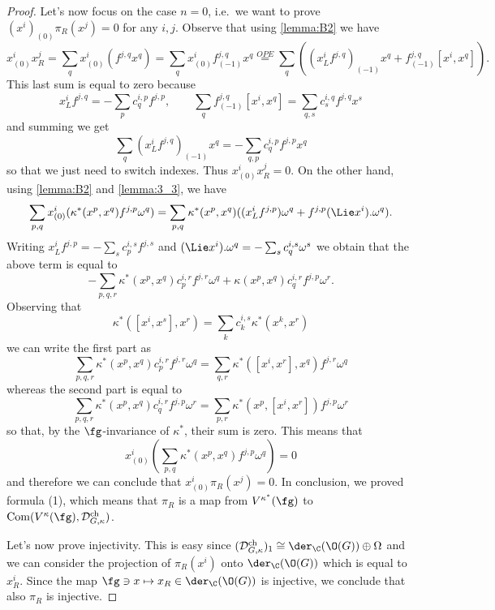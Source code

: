 \documentclass[a4paper, 10pt]{article}
\newcommand{\Dc}{ \mathcal{D}^{\mathrm{ch}}_{G, \kappa} }         %
\begin{document}
\begin{proof}
                Let's now focus on the case $n = 0$, i.e.\ we want to prove $(x^i)_{(0)}\pi_R(x^j) = 0$ for any $i, j$. Observe that using \cref{lemma:B2} we have \[x^i_{(0)}x^j_R = \sum_q x^i_{(0)}(f^{j,q}x^q) = \sum_q x^i_{(0)}f^{j,q}_{(-1)}x^q \stackrel{OPE}{=} \sum_q ((x^i_Lf^{j,q})_{(-1)}x^q + f^{j,q}_{(-1)}[x^i, x^q]).  \] This last sum is equal to zero because \[x^i_Lf^{j,q} = -\sum_p c^{i,p}_qf^{j,p},\qquad \sum_q f^{j,q}_{(-1)}[x^i,x^q] = \sum_{q,s} c_s^{i,q}f^{j,q}x^s \] and summing we get \[\sum_q (x^i_Lf^{j,q})_{(-1)}x^q = - \sum_{q,p} c^{i,p}_qf^ {j,p}x^q \] so that we just need to switch indexes. Thus $x^i_{(0)}x^j_R = 0$.
                On the other hand, using \cref{lemma:B2} and \cref{lemma:3_3}, we have 
                \begin{gather*}
                    \sum_{p,q} x^i_{(0)}(\kappa^*(x^p, x^q)f^{j,p}\omega^q) = \sum_{p,q} \kappa^*(x^p, x^q)((x^i_Lf^{j, p})\omega^q + f^{j,p}(\Lie x^i).\omega^q).
                \end{gather*}
                Writing $x^i_Lf^{j,p} = -\sum_s c^{i,s}_pf^{j,s}$ and $(\Lie x^i).\omega^q= -\sum_s c^{i,s}_q\omega^s$ we obtain that the above term is equal to \[-\sum_{p,q,r} \kappa^*(x^p, x^q)c^{i,r}_pf^{j,r}\omega^q + \kappa(x^p, x^q)c^{i,r}_qf^{j,p}\omega^r. \] Observing that \[\kappa^*([x^i, x^s], x^r) = \sum_k c^{i,s}_k \kappa^*(x^k, x^r) \] we can write the first part as\[ \sum_{p,q,r} \kappa^*(x^p, x^q)c^{i,r}_pf^{j,r}\omega^q = \sum_{q, r} \kappa^*([x^i, x^r], x^q)f^{j,r}\omega^q \] whereas the second part is equal to \[\sum_{p,q,r} \kappa^*(x^p, x^q)c^{i, r}_qf^{j,p}\omega^r = \sum_{p,r}\kappa^*(x^p, [x^i, x^r])f^{j,p}\omega^r \] so that, by the $\fg$-invariance of $\kappa^*$, their sum is zero. This means that \[x^i_{(0)}\left( \sum_{p,q} \kappa^*(x^p, x^q)f^{j,p}\omega^q \right) = 0 \] and therefore we can conclude that $x^i_{(0)}\pi_R(x^j) = 0$.
                In conclusion, we proved formula (1), which means that $\pi_R$ is a map from $V^{\kappa^*}(\fg)$ to $\mathrm{Com}(V^{\kappa}(\fg), \Dc)$.

                Let's now prove injectivity. This is easy since $(\Dc)_1 \cong \der_{\C}(\O(G)) \oplus \Omega$ and we can consider the projection of $\pi_R(x^i)$ onto $\der_{\C}(\O(G))$ which is equal to $x^i_R$. Since the map $\fg \ni x \mapsto x_R \in \der_{\C}(\O(G))$ is injective, we conclude that also $\pi_R$ is injective.


\end{proof}
\end{document}
